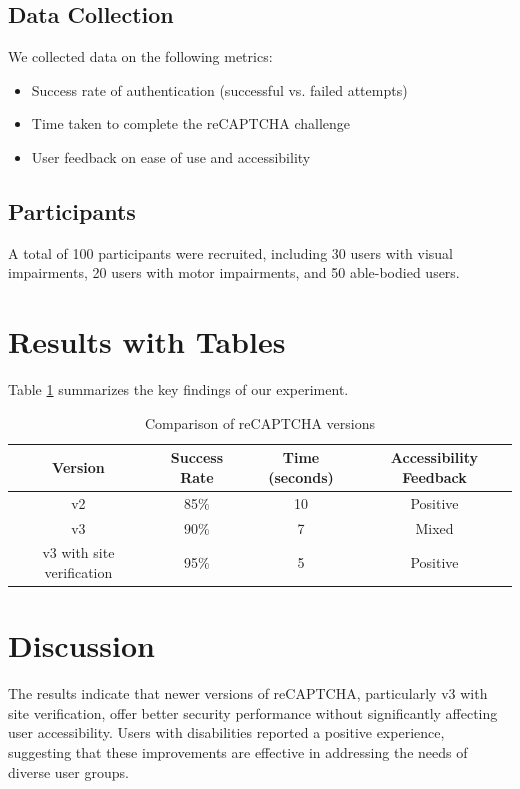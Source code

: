 \documentclass{article}
\begin{document}
\subsection{Data Collection}
We collected data on the following metrics:
\begin{itemize}
    \item Success rate of authentication (successful vs. failed attempts)
    \item Time taken to complete the reCAPTCHA challenge
    \item User feedback on ease of use and accessibility
\end{itemize}

\subsection{Participants}
A total of 100 participants were recruited, including 30 users with visual impairments, 20 users with motor impairments, and 50 able-bodied users.

\section{Results with Tables}
Table \ref{tab:results} summarizes the key findings of our experiment.

\begin{table}[htbp]
    \centering
    \begin{tabular}{|c|c|c|c|}
        \hline
        \textbf{Version} & \textbf{Success Rate} & \textbf{Time (seconds)} & \textbf{Accessibility Feedback} \\
        \hline
        v2 & 85\% & 10 & Positive \\
        \hline
        v3 & 90\% & 7 & Mixed \\
        \hline
        v3 with site verification & 95\% & 5 & Positive \\
        \hline
    \end{tabular}
    \caption{Comparison of reCAPTCHA versions}
    \label{tab:results}
\end{table}

\section{Discussion}
The results indicate that newer versions of reCAPTCHA, particularly v3 with site verification, offer better security performance without significantly affecting user accessibility. Users with disabilities reported a positive experience, suggesting that these improvements are effective in addressing the needs of diverse user groups.
\end{document}
